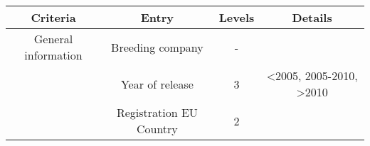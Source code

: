 \documentclass[a4paper]{article}
\begin{document}
\begin{longtable}[]{@{}cccc@{}}
\toprule
\begin{minipage}[b]{0.24\columnwidth}\centering\strut
Criteria\strut
\end{minipage} & \begin{minipage}[b]{0.28\columnwidth}\centering\strut
Entry\strut
\end{minipage} & \begin{minipage}[b]{0.09\columnwidth}\centering\strut
Levels\strut
\end{minipage} & \begin{minipage}[b]{0.29\columnwidth}\centering\strut
Details\strut
\end{minipage}\tabularnewline
\midrule
\endhead
\begin{minipage}[t]{0.24\columnwidth}\centering\strut
General information\strut
\end{minipage} & \begin{minipage}[t]{0.28\columnwidth}\centering\strut
Breeding company\strut
\end{minipage} & \begin{minipage}[t]{0.09\columnwidth}\centering\strut
-\strut
\end{minipage} & \begin{minipage}[t]{0.29\columnwidth}\centering\strut
\strut
\end{minipage}\tabularnewline
\begin{minipage}[t]{0.24\columnwidth}\centering\strut
\strut
\end{minipage} & \begin{minipage}[t]{0.28\columnwidth}\centering\strut
Year of release\strut
\end{minipage} & \begin{minipage}[t]{0.09\columnwidth}\centering\strut
3\strut
\end{minipage} & \begin{minipage}[t]{0.29\columnwidth}\centering\strut
\textless{}2005, 2005-2010, \textgreater{}2010\strut
\end{minipage}\tabularnewline
\begin{minipage}[t]{0.24\columnwidth}\centering\strut
\strut
\end{minipage} & \begin{minipage}[t]{0.28\columnwidth}\centering\strut
Registration EU Country\strut
\end{minipage} & \begin{minipage}[t]{0.09\columnwidth}\centering\strut
2\strut
\end{minipage} & \begin{minipage}[t]{0.29\columnwidth}\centering\strut

\end{minipage}
\end{longtable}
\end{document}
